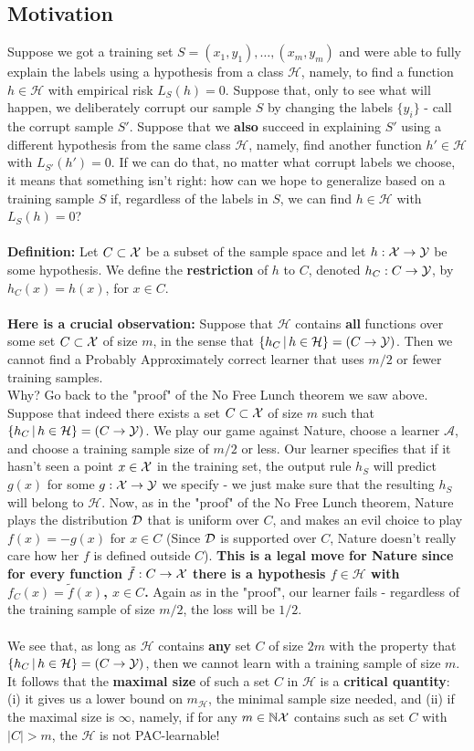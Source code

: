 \documentclass[11pt]{article}
\newcommand{\Ac}{\mathcal{A}}
\newcommand{\Hc}{\mathcal{H}}
\begin{document}
\subsection{Motivation}

Suppose we got a training set $S = (x_1,y_1),\ldots,(x_m,y_m)$ and were able to fully explain the labels using a hypothesis from a class $\Hc$, namely, to find a function $h\in\Hc$ with empirical risk $L_S(h)=0$. Suppose that, only to see what will happen, we deliberately corrupt our sample $S$ by changing the labels $\{y_i\}$ - call the corrupt sample $S'$. Suppose that we  {\bf also} succeed in explaining $S'$  using a different hypothesis from the same class $\Hc$, namely, find another function $h'\in\Hc$ with $L_{S'}(h')=0$. If we can do that, no matter what corrupt labels we choose, it means that something isn't right: how can we hope to generalize based on a training sample $S$ if, regardless of the labels in $S$, we can find $h\in\Hc$ with $L_S(h)=0$? 
\\~\\
{\bf Definition:} Let $C\subset\mathcal{X}$ be a subset of the sample space and let $h:\mathcal{X}\to\mathcal{Y}$ be some hypothesis. 
We define the {\bf restriction} of $h$ to $C$, denoted $h_C:C\to\mathcal{Y}$, by $h_C(x)=h(x)$, for $x\in C$.
\\~\\
{\bf Here is a crucial observation:} Suppose that $\Hc$ contains {\bf all} functions over some set $C\subset\mathcal{X}$ of size $m$, in the sense that $\{h_C\,|\,h\in\Hc\} = (C\to\Y)$. Then we cannot find a Probably Approximately correct learner that uses $m/2$ or fewer training samples.\\
Why? Go back to the "proof" of the No Free Lunch theorem we saw above. Suppose that indeed there exists a set $C\subset \mathcal{X}$ of size $m$ such that $\{h_C\,|\,h\in\Hc\} = (C\to\Y)$. We play our game against Nature, choose a learner $\Ac$, and choose a training sample size of $m/2$ or less. Our learner specifies that if it hasn't seen a point $x\in\mathcal{X}$ in the training set, the output rule $h_S$ will predict $g(x)$ for some $g:\mathcal{X}\to\mathcal{Y}$ we specify - we just make sure that the resulting $h_S$ will belong to $\Hc$. 
Now, as in the "proof" of the No Free Lunch theorem, Nature plays the distribution $\mathcal{D}$ that is uniform over  $C$, and makes an evil choice to play $f(x)=-g(x)$ for $x\in C$ (Since $\mathcal{D}$ is supported over $C$, Nature doesn't really care how her $f$ is defined outside $C$). {\bf This is a legal move for Nature since for every function $\tilde{f}:C\to\mathcal{X}$ there is a hypothesis $f\in\Hc$ with $f_C(x)=\tilde{f}(x)$, $x\in C$.} Again as in the "proof", our learner fails - regardless of the training sample of size $m/2$, the loss will be $1/2$.
\\~\\
We see that, as long as $\Hc$ contains {\bf any} set $C$ of size $2m$ with the property that $\{h_C\,|\,h\in\Hc\} = (C\to\Y)$, then we cannot learn with a training sample of size $m$. It follows that the {\bf maximal size} of such a set $C$ in $\Hc$ is a {\bf critical quantity}: (i) it gives us a lower bound on $m_\Hc$, the minimal sample size needed, and (ii) if the maximal size is $\infty$, namely, if for any $m\in\mathbb{N} \mathcal{X}$ contains such as set $C$ with $|C|>m$, the $\Hc$ is not PAC-learnable!
\end{document}
